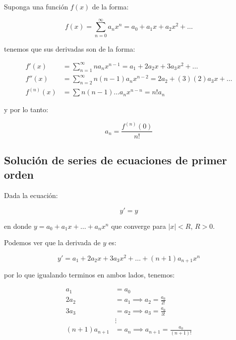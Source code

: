 		\begin{ejemplo}
		\end{ejemplo}

		\begin{observacion}
			Suponga una función $f(x)$ de la forma:

			\begin{equation}
				f(x) = \sum_{n=0}^{\infty} a_n x^n = a_0 + a_1 x + a_2 x^2 + \dots
			\end{equation}

			tenemos que sus derivadas son de la forma:

			\begin{align*}
				f'(x) &= \sum_{n=1}^{\infty} n a_n x^{n-1} = a_1 + 2 a_2 x + 3 a_3 x^2 + \dots \\
				f''(x) &= \sum_{n=2}^{\infty} n (n-1) a_n x^{n-2} = 2 a_2 + (3)(2) a_3 x + \dots \\
				f^{(n)}(x) &= \sum n (n-1) \dots a_n x^{n-n} = n! a_n
			\end{align*}

			y por lo tanto:

			\begin{equation*}
				a_n = \frac{f^{(n)}(0)}{n!}
			\end{equation*}
		\end{observacion}

	\newpage
	\subsection{Solución de series de ecuaciones de primer orden}

		Dada la ecuación:

		\begin{equation*}
			y' = y
		\end{equation*}

		en donde $y = a_0 + a_1 x + \dots + a_n x^n$ que converge para $|x| < R$, $R > 0$.

		Podemos ver que la derivada de $y$ es:

		\begin{equation*}
			y' = a_1 + 2 a_2 x + 3 a_3 x^2 + \dots + (n + 1) a_{n+1} x^n
		\end{equation*}

		por lo que igualando terminos en ambos lados, tenemos:

		\begin{align*}
			a_1 &= a_0 \\
			2 a_2 &= a_1 \implies a_2 = \frac{a_0}{2!} \\
			3 a_3 &= a_2 \implies a_3 = \frac{a_0}{3!} \\
			&\vdots \\
			(n+1) a_{n+1} &= a_n \implies a_{n+1} = \frac{a_0}{(n+1)!}
		\end{align*}

